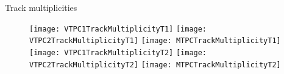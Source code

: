 \documentclass[11pt]{beamer}
\begin{document}
\begin{frame}{Track multiplicities}
  \begin{figure}
    \texttt{[image: VTPC1TrackMultiplicityT1]}
    \texttt{[image: VTPC2TrackMultiplicityT1]}
    \texttt{[image: MTPCTrackMultiplicityT1]}\\
    \texttt{[image: VTPC1TrackMultiplicityT2]}
    \texttt{[image: VTPC2TrackMultiplicityT2]}
    \texttt{[image: MTPCTrackMultiplicityT2]}
  \end{figure}
\end{frame}

\end{document}
